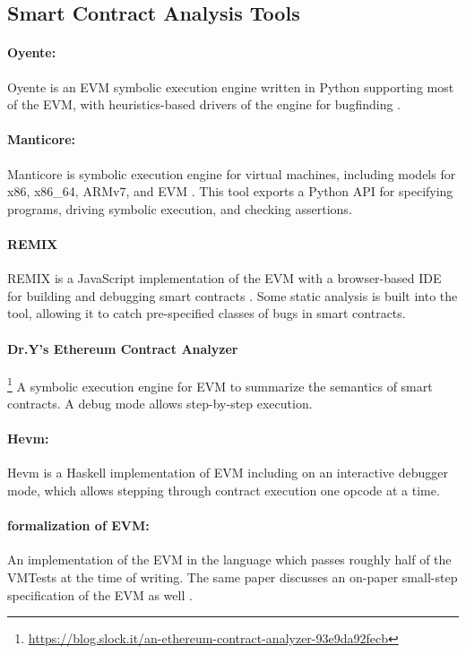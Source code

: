 \subsection{Smart Contract Analysis Tools}

\paragraph{Oyente:}
Oyente is an EVM symbolic execution engine written in Python supporting most of
the EVM, with heuristics-based drivers of the engine for bugfinding \cite{OyenteUrl}.


\paragraph{Manticore:}
Manticore is symbolic execution engine for virtual machines, including models for x86, x86\_64, ARMv7, and EVM
\cite{ManticoreUrl}.
This tool exports a Python API for specifying programs, driving symbolic execution, and checking assertions.

\paragraph{REMIX}
REMIX is a JavaScript implementation of the EVM with a browser-based IDE for building and debugging smart contracts
\cite{RemixUrl}.
Some static analysis is built into the tool, allowing it to catch pre-specified classes of bugs in smart contracts.

\paragraph{Dr.\/Y's Ethereum Contract Analyzer}\footnote{\url{https://blog.slock.it/an-ethereum-contract-analyzer-93e9da92fecb}}
A symbolic execution engine for EVM to summarize the semantics of smart contracts.
A debug mode allows step-by-step execution.

\paragraph{Hevm:}
Hevm \cite{HevmUrl} is a Haskell implementation of EVM including on an interactive debugger mode, which allows stepping through contract execution one opcode at a time.

\paragraph{\Fstar{} formalization of EVM:}
An implementation of the EVM in the \Fstar{} language \cite{FstarUrl}
 which passes roughly half of the VMTests at the time of writing.
The same paper discusses an on-paper small-step specification of the EVM as well
\cite{GrishchenkoETAPS18}.
